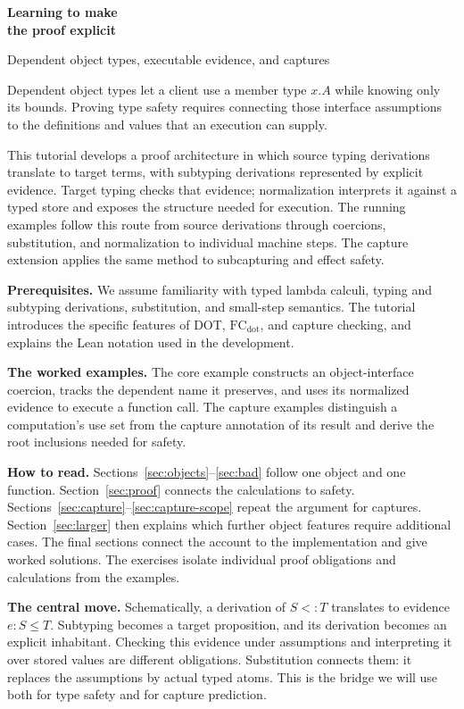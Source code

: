 \documentclass[11pt,a4paper]{article}
\newcommand{\FC}{\ensuremath{\mathrm{FC}_{\mathrm{dot}}}}
\newcommand{\remember}[1]{\par\smallskip\noindent
  \colorbox{wash}{\parbox{\dimexpr\linewidth-2\fboxsep\relax}{\strut#1\strut}}
  \par\smallskip}
\newcounter{exercise}
\begin{document}
\thispagestyle{fancy}
{\huge\sffamily\bfseries\color{ink} Learning to make\\[3pt] the proof explicit\par}
\vspace{6pt}
{\Large Dependent object types, executable evidence, and captures\par}
\vspace{10pt}

Dependent object types let a client use a member type $x.A$ while
knowing only its bounds. Proving type safety requires connecting those
interface assumptions to the definitions and values that an execution
can supply.

This tutorial develops a proof architecture in which source typing
derivations translate to target terms, with subtyping derivations
represented by explicit evidence. Target typing checks that evidence;
normalization interprets
it against a typed store and exposes the structure needed for execution.
The running examples follow this route from source derivations through
coercions, substitution, and normalization to individual machine steps.
The capture extension applies the same method to subcapturing and
effect safety.

\textbf{Prerequisites.}
We assume familiarity with typed lambda calculi, typing and subtyping
derivations, substitution, and small-step semantics. The tutorial
introduces the specific features of DOT, \FC{}, and capture checking,
and explains the Lean notation used in the development.

\textbf{The worked examples.}
The core example constructs an object-interface coercion, tracks the
dependent name it preserves, and uses its normalized evidence to execute
a function call. The capture examples distinguish a computation's use
set from the capture annotation of its result and derive the root
inclusions needed for safety.

\textbf{How to read.}
Sections~\ref{sec:objects}--\ref{sec:bad} follow one object and one function.
Section~\ref{sec:proof} connects the calculations to safety.
Sections~\ref{sec:capture}--\ref{sec:capture-scope} repeat the argument
for captures. Section~\ref{sec:larger} then explains which further
object features require additional cases. The final sections connect the account to
the implementation and give worked solutions. The exercises isolate
individual proof obligations and calculations from the examples.

\remember{\textbf{The central move.}
Schematically, a derivation of $S<:T$ translates to evidence $e:S\le T$.
Subtyping becomes a target proposition, and its derivation becomes an
explicit inhabitant. Checking this evidence under assumptions and
interpreting it over stored values are different obligations. Substitution
connects them: it replaces the assumptions by actual typed atoms. This
is the bridge we will use both for type safety and for capture prediction.}
\end{document}
